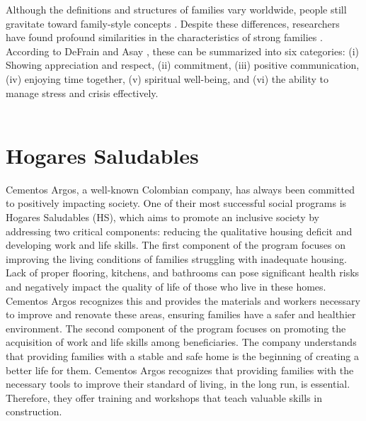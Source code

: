         Although the definitions and structures of families vary worldwide, people still gravitate toward family-style concepts \cite{defrain_strong_2007}. Despite these differences, researchers have found profound similarities in the characteristics of strong families \cite{krysan_identifying_1990}. According to DeFrain and Asay \citeyear{defrain_strong_2007}, these can be summarized into six categories: (i) Showing appreciation and respect, (ii) commitment, (iii) positive communication, (iv) enjoying time together, (v) spiritual well-being, and (vi) the ability to manage stress and crisis effectively. \\
        \\


\section{Hogares Saludables}

       Cementos Argos, a well-known Colombian company, has always been committed to positively impacting society. One of their most successful social programs is Hogares Saludables (HS), which aims to promote an inclusive society by addressing two critical components: reducing the qualitative housing deficit and developing work and life skills. The first component of the program focuses on improving the living conditions of families struggling with inadequate housing. Lack of proper flooring, kitchens, and bathrooms can pose significant health risks and negatively impact the quality of life of those who live in these homes. Cementos Argos recognizes this and provides the materials and workers necessary to improve and renovate these areas, ensuring families have a safer and healthier environment. The second component of the program focuses on promoting the acquisition of work and life skills among beneficiaries. The company understands that providing families with a stable and safe home is the beginning of creating a better life for them. Cementos Argos recognizes that providing families with the necessary tools to improve their standard of living, in the long run, is essential. Therefore, they offer training and workshops that teach valuable skills in construction. 

